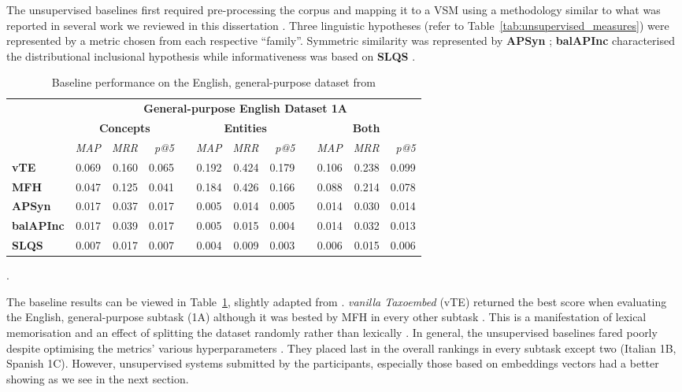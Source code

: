 The unsupervised baselines first required pre-processing the corpus and mapping it to a \ac{VSM} using a methodology similar to what was reported in several work we reviewed in this dissertation \citep{shwartz2017siege, santus2014chasing, roller2014inclusive}.  Three linguistic hypotheses (refer to Table~\ref{tab:unsupervised_measures}) were represented by a metric chosen from each respective ``family''. Symmetric similarity was represented by \textbf{APSyn} \citep{santus2016unsupervised}; \textbf{balAPInc} \citep{kotlerman2010directional} characterised the distributional inclusional hypothesis while informativeness was based on \textbf{SLQS} \citep{santus2014chasing}.

\begin{table}\centering
    \begin{tabular}{@{}lrrrcrrrcrrr@{}} \toprule
    & \multicolumn{11}{c}{\textbf{General-purpose English Dataset 1A}} \\
    \cmidrule{2-12}
    & \multicolumn{3}{c}{\textbf{Concepts}} & \phantom{a} & \multicolumn{3}{c}{\textbf{Entities}} & \phantom{a} & \multicolumn{3}{c}{\textbf{Both}} \\ 
    \cmidrule{2-4} \cmidrule{6-8} \cmidrule{10-12}
    & \textit{MAP} & \textit{MRR} & \textit{p@5} && 
      \textit{MAP} & \textit{MRR} & \textit{p@5} && 
      \textit{MAP} & \textit{MRR} & \textit{p@5} \\  \midrule
    \textbf{vTE} & 0.069 & 0.160 & 0.065 && 0.192 & 0.424 & 0.179 && 0.106 & 0.238 & 0.099 \\
    \textbf{MFH} & 0.047 & 0.125 & 0.041 && 0.184 & 0.426 & 0.166 && 0.088 & 0.214 & 0.078 \\
    \textbf{APSyn} & 0.017 & 0.037 & 0.017 && 0.005 & 0.014 & 0.005 && 0.014 & 0.030 & 0.014 \\
    \textbf{balAPInc} & 0.017 & 0.039 & 0.017 && 0.005 & 0.015 & 0.004 && 0.014 & 0.032 & 0.013 \\
    \textbf{SLQS} & 0.007 & 0.017 & 0.007 && 0.004 & 0.009 & 0.003 && 0.006 & 0.015 & 0.006 \\
    \bottomrule
    \end{tabular}
    \caption{Baseline performance on the English, general-purpose dataset from \citep{camacho2018semeval}}.\label{tab:semeval_baseline}
\end{table}

The baseline results can be viewed in Table~\ref{tab:semeval_baseline}, slightly adapted from \citep{camacho2018semeval}.  \textit{vanilla Taxoembed} (vTE) returned the best score when evaluating the English, general-purpose subtask (1A) although it was bested by \ac{MFH} in every other subtask \citep{camacho2018semeval}.  This is a manifestation of lexical memorisation and an effect of splitting the dataset randomly rather than lexically \citep{levy2014dependency}.  In general, the unsupervised baselines fared poorly despite optimising the metrics' various hyperparameters \citep{camacho2018semeval}.  They placed last in the overall rankings in every subtask except two (Italian 1B, Spanish 1C).  However, unsupervised systems submitted by the participants, especially those based on embeddings vectors had a better showing as we see in the next section.


